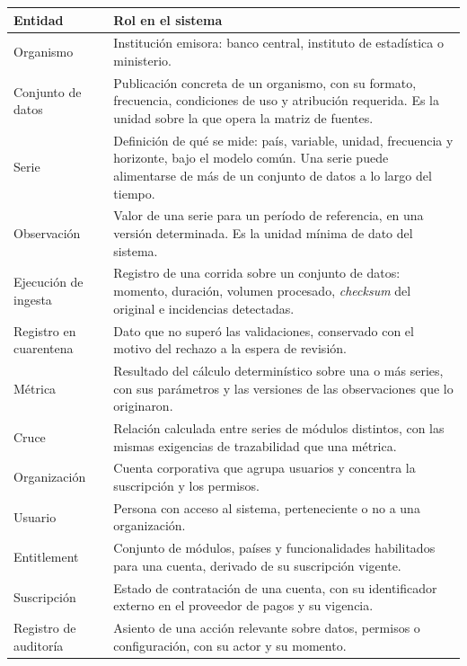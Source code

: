 \documentclass[11pt,a4paper]{article}
\begin{document}
\begin{tabularx}{\textwidth}{@{}l X@{}}
\toprule
\textbf{Entidad} & \textbf{Rol en el sistema} \\
\midrule
Organismo & Instituci\'on emisora: banco central, instituto de estad\'istica o ministerio. \\
\addlinespace
Conjunto de datos & Publicaci\'on concreta de un organismo, con su formato, frecuencia, condiciones de uso y atribuci\'on requerida. Es la unidad sobre la que opera la matriz de fuentes. \\
\addlinespace
Serie & Definici\'on de qu\'e se mide: pa\'is, variable, unidad, frecuencia y horizonte, bajo el modelo com\'un. Una serie puede alimentarse de m\'as de un conjunto de datos a lo largo del tiempo. \\
\addlinespace
Observaci\'on & Valor de una serie para un per\'iodo de referencia, en una versi\'on determinada. Es la unidad m\'inima de dato del sistema. \\
\addlinespace
Ejecuci\'on de ingesta & Registro de una corrida sobre un conjunto de datos: momento, duraci\'on, volumen procesado, \emph{checksum} del original e incidencias detectadas. \\
\addlinespace
Registro en cuarentena & Dato que no super\'o las validaciones, conservado con el motivo del rechazo a la espera de revisi\'on. \\
\addlinespace
M\'etrica & Resultado del c\'alculo determin\'istico sobre una o m\'as series, con sus par\'ametros y las versiones de las observaciones que lo originaron. \\
\addlinespace
Cruce & Relaci\'on calculada entre series de m\'odulos distintos, con las mismas exigencias de trazabilidad que una m\'etrica. \\
\addlinespace
Organizaci\'on & Cuenta corporativa que agrupa usuarios y concentra la suscripci\'on y los permisos. \\
\addlinespace
Usuario & Persona con acceso al sistema, perteneciente o no a una organizaci\'on. \\
\addlinespace
Entitlement & Conjunto de m\'odulos, pa\'ises y funcionalidades habilitados para una cuenta, derivado de su suscripci\'on vigente. \\
\addlinespace
Suscripci\'on & Estado de contrataci\'on de una cuenta, con su identificador externo en el proveedor de pagos y su vigencia. \\
\addlinespace
Registro de auditor\'ia & Asiento de una acci\'on relevante sobre datos, permisos o configuraci\'on, con su actor y su momento. \\
\bottomrule
\end{tabularx}
\end{document}

